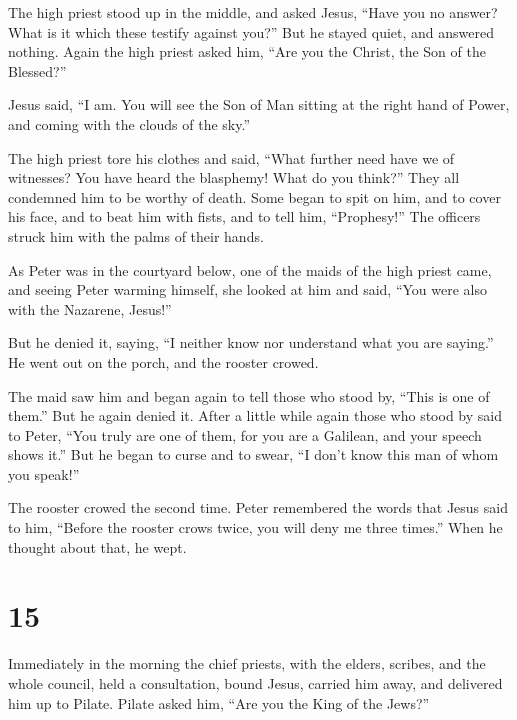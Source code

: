  The high priest stood up in the middle, and asked Jesus,
``Have you no answer? What is it which these testify against you?''
 But he stayed quiet, and answered nothing. Again the
high priest asked him, ``Are you the Christ, the Son of the Blessed?''

 Jesus said, ``I am. You will see the Son of Man sitting
at the right hand of Power, and coming with the clouds of the sky.''

 The high priest tore his clothes and said, ``What
further need have we of witnesses?  You have heard the
blasphemy! What do you think?'' They all condemned him to be worthy of
death.  Some began to spit on him, and to cover his face,
and to beat him with fists, and to tell him, ``Prophesy!'' The officers
struck him with the palms of their hands.

 As Peter was in the courtyard below, one of the maids of
the high priest came,  and seeing Peter warming himself,
she looked at him and said, ``You were also with the Nazarene, Jesus!''

 But he denied it, saying, ``I neither know nor
understand what you are saying.'' He went out on the porch, and the
rooster crowed.

 The maid saw him and began again to tell those who stood
by, ``This is one of them.''  But he again denied it.
After a little while again those who stood by said to Peter, ``You truly
are one of them, for you are a Galilean, and your speech shows it.''
 But he began to curse and to swear, ``I don't know this
man of whom you speak!''

 The rooster crowed the second time. Peter remembered the
words that Jesus said to him, ``Before the rooster crows twice, you will
deny me three times.'' When he thought about that, he wept.

\hypertarget{section-14}{%
\section{15}\label{section-14}}

 Immediately in the morning the chief priests, with the
elders, scribes, and the whole council, held a consultation, bound
Jesus, carried him away, and delivered him up to Pilate. 
Pilate asked him, ``Are you the King of the Jews?''

